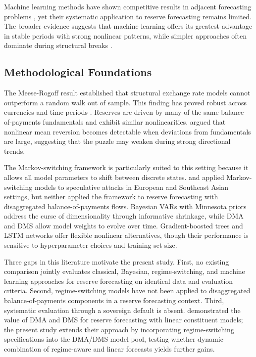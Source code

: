 \documentclass[12pt,a4paper]{article}
\begin{document}
Machine learning methods have shown competitive results in adjacent forecasting problems \citep{MedeirosVasconcelosVeigaZilberman2021,RichardsonMulderVehbi2021}, yet their systematic application to reserve forecasting remains limited. The broader evidence suggests that machine learning offers its greatest advantage in stable periods with strong nonlinear patterns, while simpler approaches often dominate during structural breaks \citep{RichardsonMulderVehbi2021}.

\subsection{Methodological Foundations}

The Meese-Rogoff result \citep{MeeseRogoff1983} established that structural exchange rate models cannot outperform a random walk out of sample. This finding has proved robust across currencies and time periods \citep{Rossi2013,CheungChinnPascual2005}. Reserves are driven by many of the same balance-of-payments fundamentals and exhibit similar nonlinearities. \cite{TaylorPeelSarno2001} argued that nonlinear mean reversion becomes detectable when deviations from fundamentals are large, suggesting that the puzzle may weaken during strong directional trends.

The Markov-switching framework \citep{Hamilton1989,Krolzig1997} is particularly suited to this setting because it allows all model parameters to shift between discrete states. \cite{Peria2002} and \cite{BrunettiMarianoScottiTan2007} applied Markov-switching models to speculative attacks in European and Southeast Asian settings, but neither applied the framework to reserve forecasting with disaggregated balance-of-payments flows. Bayesian VARs with Minnesota priors \citep{Litterman1986,Banbura2010} address the curse of dimensionality through informative shrinkage, while DMA and DMS \citep{Raftery2010,KoopKorobilis2012} allow model weights to evolve over time. Gradient-boosted trees \citep{ChenGuestrin2016} and LSTM networks \citep{HochreiterSchmidhuber1997} offer flexible nonlinear alternatives, though their performance is sensitive to hyperparameter choices and training set size.

Three gaps in this literature motivate the present study. First, no existing comparison jointly evaluates classical, Bayesian, regime-switching, and machine learning approaches for reserve forecasting on identical data and evaluation criteria. Second, regime-switching models have not been applied to disaggregated balance-of-payments components in a reserve forecasting context. Third, systematic evaluation through a sovereign default is absent. \cite{Gupta2014} demonstrated the value of DMA and DMS for reserve forecasting with linear constituent models; the present study extends their approach by incorporating regime-switching specifications into the DMA/DMS model pool, testing whether dynamic combination of regime-aware and linear forecasts yields further gains.
\end{document}
